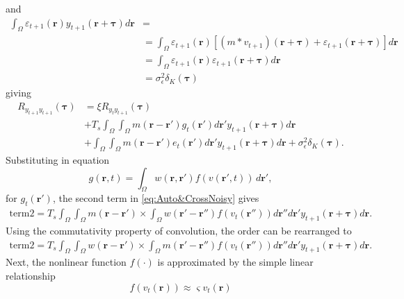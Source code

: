 \documentclass[]{article}
\begin{document}
and
\begin{align}
 \int_{\Omega}\varepsilon_{t+1}(\mathbf{r})y_{t+1}(\mathbf{r}+\boldsymbol{\tau}) d\mathbf{r}&= \nonumber \\
&=\int_{\Omega}\varepsilon_{t+1}(\mathbf{r})\left[(m \ast v_{t+1})(\mathbf r+\boldsymbol\tau)+ \varepsilon_{t+1}(\mathbf{r}+\boldsymbol{\tau})\right] d\mathbf{r} \nonumber \\
&=\int_{\Omega}\varepsilon_{t+1}(\mathbf{r}) \varepsilon_{t+1}(\mathbf{r}+\boldsymbol{\tau}) d\mathbf{r} \nonumber \\
&=\sigma_{\epsilon}^2\delta_K(\boldsymbol{\tau})
\end{align}
giving
\begin{align}\label{eq:Auto&CrossNoisy}
	R_{y_{t+1}y_{t+1}}(\boldsymbol{\tau}) &= \xi R_{y_ty_{t+1}}(\boldsymbol{\tau}) \nonumber \\
	&+ T_s \int_{\Omega}\int_{\Omega} m(\mathbf{r}-\mathbf{r}')  g_t(\mathbf{r}') d\mathbf{r}' y_{t+1}(\mathbf{r}+\boldsymbol{\tau}) d\mathbf{r} \nonumber \\
	&+\int_{\Omega}\int_{\Omega} m(\mathbf{r}-\mathbf{r}')e_t(\mathbf{r}')d\mathbf{r}'y_{t+1}(\mathbf{r}+\boldsymbol{\tau}) d\mathbf{r}+\sigma_{\epsilon}^2\delta_K(\boldsymbol{\tau}).
\end{align}
Substituting in equation
\begin{equation}
	\label{eq:RateBasedInteractions} g\left( \mathbf{r},t \right) = \int_\Omega {w\left( \mathbf{r},\mathbf{r}' \right)f\left( v\left( \mathbf{r}',t \right) \right)\, d\mathbf{r}'}, 
\end{equation}
for $g_t(\mathbf{r}')$, the second term in \eqref{eq:Auto&CrossNoisy} gives
\begin{align}
	\text{term2} = T_s \int_{\Omega}\int_{\Omega} m(\mathbf{r}-\mathbf{r}') 
	\times \int_{\Omega} w(\mathbf{r}'-\mathbf{r}'') f\left(v_t(\mathbf{r}'')\right)d\mathbf{r}'' d\mathbf{r}' y_{t+1}(\mathbf{r}+\boldsymbol{\tau}) d\mathbf{r}. 
\end{align} 
Using the commutativity property of convolution, the order can be rearranged to
\begin{align}
	\text{term2}  =  T_s \int_{\Omega}\int_{\Omega} w(\mathbf{r}-\mathbf{r}')
	\times \int_{\Omega} m(\mathbf{r}'-\mathbf{r}'') f\left(v_t(\mathbf{r}'')\right) d\mathbf{r}'' d\mathbf{r}' y_{t+1}(\mathbf{r}+\boldsymbol{\tau}) d\mathbf{r}.
\end{align}
Next, the nonlinear function $f(\cdot)$ is approximated by the simple linear relationship
\begin{equation}
	f\left(v_t(\mathbf{r})\right) \approx \varsigma v_t(\mathbf{r})
\end{equation} 
\end{document}

